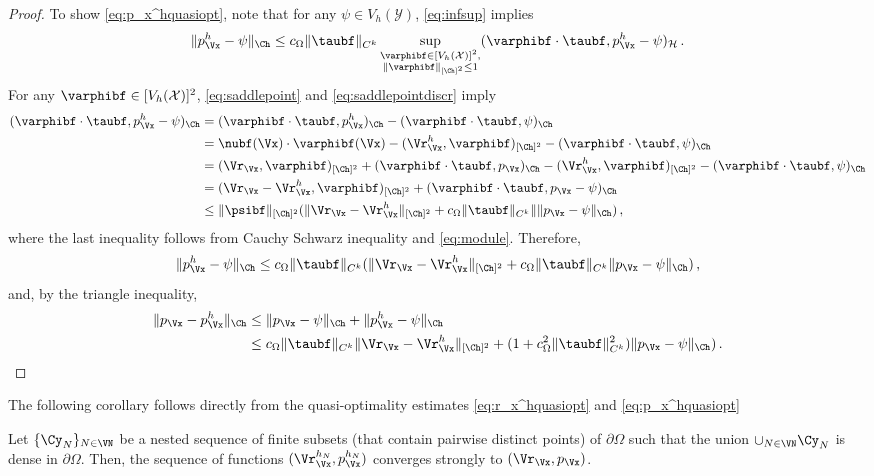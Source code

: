 \documentclass{siamart1116}
\numberwithin{theorem}{section}
\begin{document}
\begin{proof}
To show \eqref{eq:p_x^hquasiopt}, note that for any $\psi \in V_h(\mathcal Y)$,
\cref{eq:infsup} implies
\begin{equation}
\Vert p_\Vx^h -\psi \Vert_{\Ch} \leq c_\Omega \Vert \taubf\Vert_{C^k}
\sup_{\substack{\varphibf \in [V_h(\mathcal X)]^2,\\ \|\varphibf\|_{[\Ch]^2}\le 1} }
(\varphibf \cdot \taubf, p_\Vx^h -\psi)_{\mathcal  H}\,.
\end{equation}
For any $\varphibf \in [V_h(\mathcal X)]^2$, \cref{eq:saddlepoint} and \cref{eq:saddlepointdiscr}
imply
\begin{align*}
(\varphibf \cdot \taubf, p_\Vx^h -\psi)_{\Ch}
&= (\varphibf \cdot \taubf, p_\Vx^h)_{\Ch} - (\varphibf \cdot \taubf, \psi)_{\Ch}\\
&= \nubf(\Vx)\cdot\varphibf(\Vx) - (\Vr_\Vx^h, \varphibf)_{[\Ch]^2}  - (\varphibf \cdot \taubf, \psi)_{\Ch}\\
&=(\Vr_\Vx, \varphibf)_{[\Ch]^2} + (\varphibf \cdot \taubf, p_\Vx)_{\Ch}
- (\Vr_\Vx^h, \varphibf)_{[\Ch]^2}  - (\varphibf \cdot \taubf, \psi)_{\Ch}\\
&=(\Vr_\Vx-\Vr_\Vx^h,\varphibf )_{[\Ch]^2} 
+(\varphibf \cdot \taubf, p_\Vx -\psi)_{\Ch}\\
&\leq \Vert \psibf \Vert_{[\Ch]^2}(\Vert \Vr_\Vx-\Vr_\Vx^h \Vert_{[\Ch]^2} 
+ c_\Omega \Vert \taubf \Vert_{C^k}  \Vert\Vert p_\Vx -\psi\Vert_{\Ch})\,,
\end{align*}
where the last inequality follows from Cauchy Schwarz inequality and \eqref{eq:module}.
Therefore,
\begin{equation}
\Vert p_\Vx^h -\psi \Vert_{\Ch} \leq
c_\Omega \Vert \taubf\Vert_{C^k}
(\Vert \Vr_\Vx-\Vr_\Vx^h \Vert_{[\Ch]^2} 
+ c_\Omega \Vert \taubf \Vert_{C^k}  \Vert p_\Vx -\psi\Vert_{\Ch})\,,
\end{equation}
and, by the triangle inequality,
\begin{align*}
\Vert p_\Vx - p_\Vx^h \Vert_{\Ch} &\leq \Vert p_\Vx - \psi \Vert_{\Ch} + \Vert p_\Vx^h - \psi \Vert_{\Ch}\\
&\leq c_\Omega \Vert \taubf\Vert_{C^k} \Vert \Vr_\Vx-\Vr_\Vx^h \Vert_{[\Ch]^2} 
+ (1 + c_\Omega^2\Vert \taubf \Vert_{C^k}^2)  \Vert p_\Vx -\psi\Vert_{\Ch})\,.
\end{align*}
\end{proof}

The following corollary follows directly from the quasi-optimality estimates
\eqref{eq:r_x^hquasiopt}  and \eqref{eq:p_x^hquasiopt} 
\begin{corollary}
Let $\{\Cy_N\}_{N\in\VN}$ be a nested sequence of
finite subsets (that contain pairwise distinct points) of $\partial \Omega$
such that the union $\cup_{N\in\VN}\Cy_N$ is dense in $\partial \Omega$.
Then, the sequence of functions $(\Vr_\Vx^{h_N},p_\Vx^{h_N})$ converges strongly to
$(\Vr_\Vx,p_\Vx)$.
\end{corollary}
\end{document}
